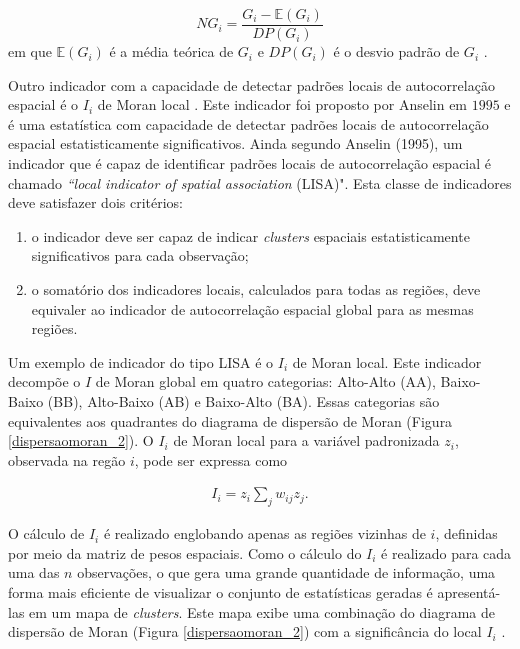\documentclass[12pt,a4paper]{article}
\begin{document}
\begin{equation}
	NG_i = \dfrac{G_i-\mathbb{E}(G_i)}{DP(G_i)}
\end{equation}
\noindent em que $\mathbb{E}(G_i)$ é a média teórica de $G_i$ e $DP(G_i)$ é o desvio padrão de $G_i$ \cite{almeida12_2}.
	

Outro indicador com a capacidade de detectar padrões locais de autocorrelação espacial é o $I_i$ de Moran local \cite{almeida12_2}. Este indicador foi proposto por Anselin em $1995$ e é uma estatística com capacidade de detectar padrões locais de autocorrelação espacial estatisticamente significativos. Ainda segundo Anselin (1995), um indicador que é capaz de identificar padrões locais de autocorrelação espacial é chamado \textit{``local indicator of spatial association} (LISA)". Esta classe de indicadores deve satisfazer dois critérios: 
	
\begin{enumerate}
	\item o indicador deve ser capaz de indicar \textit{clusters} espaciais estatisticamente significativos para cada observação;
	\item o somatório dos indicadores locais, calculados para todas as regiões, deve equivaler ao indicador de autocorrelação espacial global para as mesmas regiões.
\end{enumerate}
	
Um exemplo de indicador do tipo LISA é o $I_i$ de Moran local. Este indicador decompõe o $I$ de Moran global em quatro categorias: Alto-Alto (AA), Baixo-Baixo (BB), Alto-Baixo (AB) e  Baixo-Alto (BA). Essas categorias são equivalentes aos quadrantes do diagrama de dispersão de Moran (Figura \ref{dispersaomoran_2}). O $I_i$ de Moran local para a variável padronizada $z_i$, observada na regão $i$, pode ser expressa como 
	
\begin{align*}
	I_i = z_i \sum_{j}^{} w_{ij} z_j.
\end{align*}

O cálculo de $I_i$ é realizado englobando apenas as regiões vizinhas de $i$, definidas por meio da matriz de pesos espaciais. Como o cálculo do $I_i$ é realizado para cada uma das $n$ observações, o que gera uma grande quantidade de informação, uma forma mais eficiente de visualizar o conjunto de estatísticas geradas é apresentá-las em um mapa de \textit{clusters}. Este mapa exibe uma combinação do diagrama de dispersão de Moran (Figura \ref{dispersaomoran_2}) com a significância do local $I_i$ \cite{almeida12_2}. 
\end{document}
